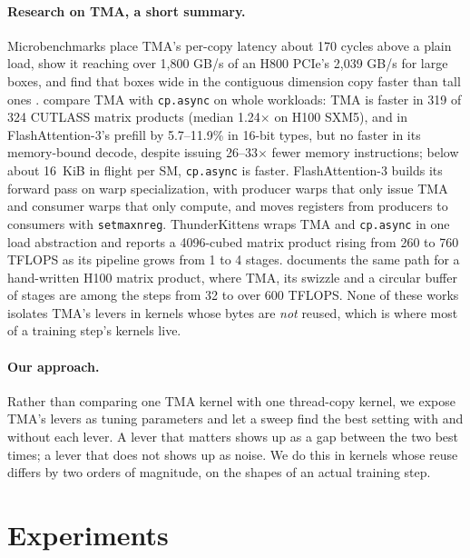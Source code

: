 \documentclass[10pt]{article}
\newcommand{\x}{\ensuremath{\times}}
\begin{document}
\paragraph{Research on TMA, a short summary.}
Microbenchmarks place TMA's per-copy latency about 170 cycles above a plain load, show it reaching over 1{,}800 GB/s of an
H800 PCIe's 2{,}039 GB/s for large boxes, and find that boxes wide in the contiguous dimension copy faster than tall ones
\citep{luo2025dissecting}. \citet{bose2026tma} compare TMA with \texttt{cp.async} on whole workloads: TMA is faster in
319 of 324 CUTLASS matrix products (median 1.24\x{} on H100 SXM5), and in FlashAttention-3's prefill by 5.7--11.9\% in
16-bit types, but no faster in its memory-bound decode, despite issuing 26--33\x{} fewer memory instructions; below about
16~KiB in flight per SM, \texttt{cp.async} is faster. FlashAttention-3 \citep{shah2024flashattention3} builds its forward
pass on warp specialization, with producer warps that only issue TMA and consumer warps that only compute, and moves
registers from producers to consumers with \texttt{setmaxnreg}. ThunderKittens \citep{spector2024thunderkittens} wraps
TMA and \texttt{cp.async} in one load abstraction and reports a 4096-cubed matrix product rising from 260 to 760 TFLOPS as its
pipeline grows from 1 to 4 stages. \citet{shankhdhar2024worklog} documents the same path for a hand-written H100 matrix
product, where TMA, its swizzle and a circular buffer of stages are among the steps from 32 to over 600 TFLOPS. None of
these works isolates TMA's levers in kernels whose bytes are \emph{not} reused, which is where most of a training step's
kernels live.

\paragraph{Our approach.}
Rather than comparing one TMA kernel with one thread-copy kernel, we expose TMA's levers as tuning parameters and let a
sweep find the best setting with and without each lever. A lever that matters shows up as a gap between the two best
times; a lever that does not shows up as noise. We do this in kernels whose reuse differs by two orders of magnitude, on
the shapes of an actual training step.

\section{Experiments}
\label{sec:experiments}
\end{document}
